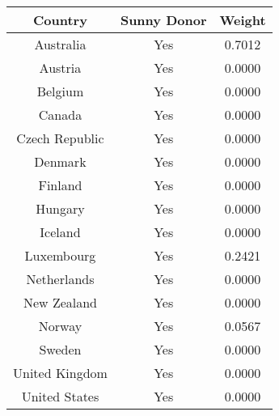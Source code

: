 \begin{tabular}{c|c|c}
\textbf{Country}&\textbf{Sunny Donor}&\textbf{Weight}\\
\hline 
Australia & Yes & 0.7012 \\ 
Austria & Yes & 0.0000 \\ 
Belgium & Yes & 0.0000 \\ 
Canada & Yes & 0.0000 \\ 
Czech Republic & Yes & 0.0000 \\ 
Denmark & Yes & 0.0000 \\ 
Finland & Yes & 0.0000 \\ 
Hungary & Yes & 0.0000 \\ 
Iceland & Yes & 0.0000 \\ 
Luxembourg & Yes & 0.2421 \\ 
Netherlands & Yes & 0.0000 \\ 
New Zealand & Yes & 0.0000 \\ 
Norway & Yes & 0.0567 \\ 
Sweden & Yes & 0.0000 \\ 
United Kingdom & Yes & 0.0000 \\ 
United States & Yes & 0.0000 \\ 
\end{tabular}